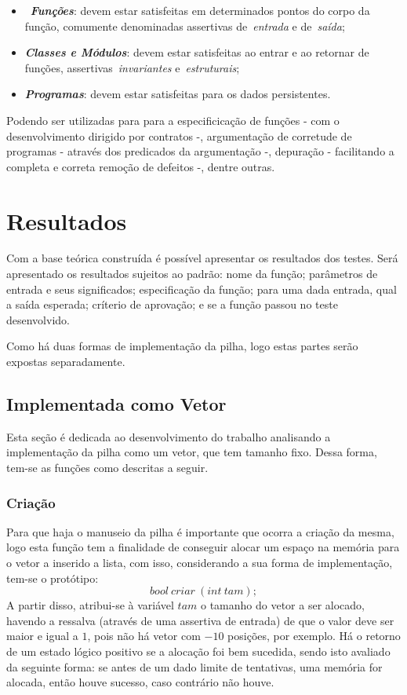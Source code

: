 \documentclass[conference]{Trabalho_1}
\begin{document}
\begin{itemize}
 \item~\textbf{\textit{Fun\c{c}\~oes}}: devem estar satisfeitas em determinados pontos do corpo da fun\c{c}\~ao, comumente denominadas assertivas de~\textit{entrada} e de~\textit{sa\'ida};
 \item \textbf{\textit{Classes e M\'odulos}}: devem estar satisfeitas ao entrar e ao retornar de fun\c{c}\~oes, assertivas~\textit{invariantes} e~\textit{estruturais};
 \item \textbf{\textit{Programas}}: devem estar satisfeitas para os dados persistentes.
\end{itemize}

Podendo ser utilizadas para para a especificica\c{c}\~ao de fun\c{c}\~oes - com o desenvolvimento dirigido por contratos -, argumenta\c{c}\~ao de corretude de programas - atrav\'es dos predicados da argumenta\c{c}\~ao -, depura\c{c}\~ao - facilitando a completa e correta remo\c{c}\~ao de defeitos -, dentre outras.


\section{Resultados}
Com a base te\'orica constru\'ida \'e poss\'ivel apresentar os resultados dos testes. Ser\'a apresentado os resultados sujeitos ao padr\~ao: nome da fun\c{c}\~ao; par\^ametros de entrada e seus significados; especifica\c{c}\~ao da fun\c{c}\~ao; para uma dada entrada, qual a sa\'ida esperada; cr\'iterio de aprova\c{c}\~ao; e se a fun\c{c}\~ao passou no teste desenvolvido.

Como h\'a duas formas de implementa\c{c}\~ao da pilha, logo estas partes ser\~ao expostas separadamente.

\subsection{Implementada como Vetor}
Esta se\c{c}\~ao \'e dedicada ao desenvolvimento do trabalho analisando a implementa\c{c}\~ao da pilha como um vetor, que tem tamanho fixo. Dessa forma, tem-se as fun\c{c}\~oes como descritas a seguir.

\subsubsection{Cria\c{c}\~ao}
Para que haja o manuseio da pilha \'e importante que ocorra a cria\c{c}\~ao da mesma, logo esta fun\c{c}\~ao tem a finalidade de conseguir alocar um espa\c{c}o na mem\'oria para o vetor a inserido a lista, com isso, considerando a sua forma de implementa\c{c}\~ao, tem-se o prot\'otipo:
$$bool\ criar\ (int\ tam); $$
A partir disso, atribui-se \`a vari\'avel $tam$ o tamanho do vetor a ser alocado, havendo a ressalva (atrav\'es de uma assertiva de entrada) de que o valor deve ser maior e igual a $1$, pois n\~ao h\'a vetor com $-10$ posi\c{c}\~oes, por exemplo. H\'a o retorno de um estado l\'ogico positivo se a aloca\c{c}\~ao foi bem sucedida, sendo isto avaliado da seguinte forma: se antes de um dado limite de tentativas, uma mem\'oria for alocada, ent\~ao houve sucesso, caso contr\'ario n\~ao houve.
\end{document}

